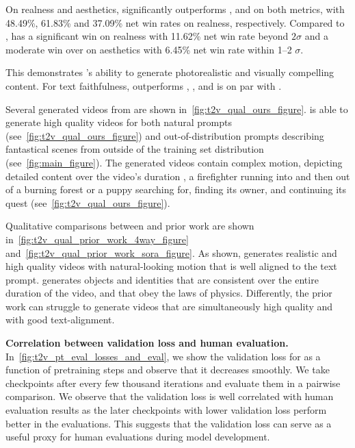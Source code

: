 On realness and aesthetics, \OursVideo significantly outperforms \RunwayGen, \LumaLabs and \Kling on both metrics, with 48.49\%, 61.83\% and 37.09\% net win rates on realness, respectively.
Compared to \Sora, \OursVideo has a significant win on realness with 11.62\% net win rate beyond $2\sigma$ and a moderate win over \Sora on aesthetics with 6.45\% net win rate within 1--2 $\sigma$.

This demonstrates \OursVideo's ability to generate photorealistic and visually compelling content.
For text faithfulness, \OursVideo outperforms \Sora, \RunwayGen, \LumaLabs and is on par with \Kling.








Several generated videos from \OursVideo are shown in~\cref{fig:t2v_qual_ours_figure}.
\OursVideo is able to generate high quality videos for both natural prompts (see~\cref{fig:t2v_qual_ours_figure}) and out-of-distribution prompts describing fantastical scenes from outside of the training set distribution (see~\cref{fig:main_figure}).
The generated videos contain complex motion, depicting detailed content over the video's duration \eg, a firefighter running into and then out of a burning forest or a puppy searching for, finding its owner, and continuing its quest (see~\cref{fig:t2v_qual_ours_figure}).

Qualitative comparisons between \OursVideo and prior work are shown in~\cref{fig:t2v_qual_prior_work_4way_figure} and~\cref{fig:t2v_qual_prior_work_sora_figure}.
As shown, \OursVideo generates realistic and high quality videos with natural-looking motion that is well aligned to the text prompt.
\OursVideo generates objects and identities that are consistent over the entire duration of the video, and that obey the laws of physics.
Differently, the prior work can struggle to generate videos that are simultaneously high quality and with good text-alignment.








\par \noindent \textbf{Correlation between validation loss and human evaluation.}
In~\cref{fig:t2v_pt_eval_losses_and_eval}, we show the validation loss for \OursVideo as a function of pretraining steps and observe that it decreases smoothly.
We take \pretrained checkpoints after every few thousand iterations and evaluate them in a pairwise comparison.
We observe that the validation loss is well correlated with human evaluation results as the later checkpoints with lower validation loss perform better in the evaluations.
This suggests that the \flowmatching validation loss can serve as a useful proxy for human evaluations during model development.





